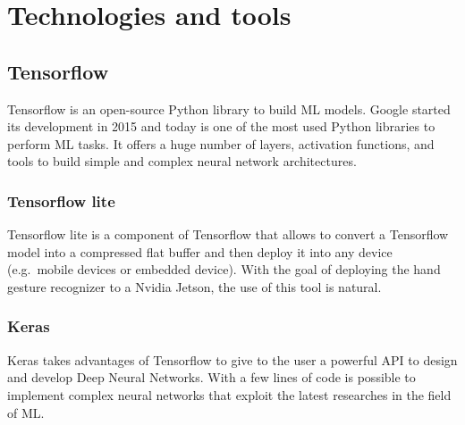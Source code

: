 \documentclass[../thesis.tex]{subfiles}
\begin{document}
\chapter{Technologies and tools}\label{cap:technologies-and-tools}

\section{Tensorflow}
Tensorflow is an open-source Python library to build \acrshort{ML} models. Google started its development in 2015 and today is one of the most used Python libraries to perform \acrshort{ML} tasks. It offers a huge number of layers, activation functions, and tools to build simple and complex neural network architectures.

\subsection{Tensorflow lite}
Tensorflow lite is a component of Tensorflow that allows to convert a Tensorflow model into a compressed flat buffer and then deploy it into any device (e.g.\ mobile devices or embedded device). With the goal of deploying the hand gesture recognizer to a Nvidia Jetson, the use of this tool is natural.

\subsection{Keras}
Keras takes advantages of Tensorflow to give to the user a powerful API to design and develop Deep Neural Networks. With a few lines of code is possible to implement complex neural networks that exploit the latest researches in the field of \gls{ML}.
\end{document}
